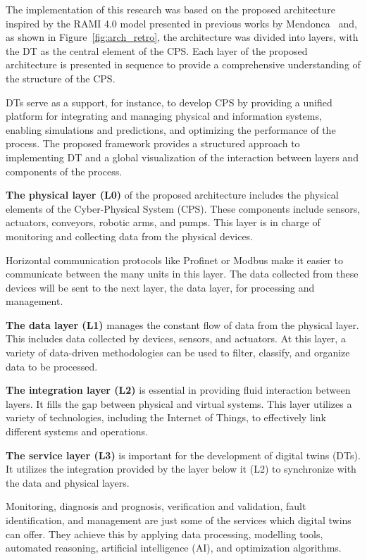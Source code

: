 \documentclass[journal]{IEEEtran}
\begin{document}
The implementation of this research was based on the proposed architecture inspired by the RAMI 4.0 model presented in previous works by Mendonca~\cite{Mendonca2022} and, as shown in Figure~\ref{fig:arch_retro}, the architecture was divided into layers, with the DT as the central element of the CPS. Each layer of the proposed architecture is presented in sequence to provide a comprehensive understanding of the structure of the CPS.

DTs serve as a support, for instance, to develop CPS by providing a unified platform for integrating and managing physical and information systems, enabling simulations and predictions, and optimizing the performance of the process\cite{Lopez2023b}. The proposed framework provides a structured approach to implementing DT and a global visualization of the interaction between layers and components of the process.

\textbf{The physical layer (L0)} of the proposed architecture includes the physical elements of the Cyber-Physical System (CPS). These components include sensors, actuators, conveyors, robotic arms, and pumps. This layer is in charge of monitoring and collecting data from the physical devices.

Horizontal communication protocols like Profinet or Modbus make it easier to communicate between the many units in this layer. The data collected from these devices will be sent to the next layer, the data layer, for processing and management.

\textbf{The data layer (L1)} manages the constant flow of data from the physical layer. This includes data collected by devices, sensors, and actuators. At this layer, a variety of data-driven methodologies can be used to filter, classify, and organize data to be processed.

\textbf{The integration layer (L2)} is essential in providing fluid interaction between layers. It fills the gap between physical and virtual systems. This layer utilizes a variety of technologies, including the Internet of Things, to effectively link different systems and operations.

\textbf{The service layer (L3)} is important for the development of digital twins (DTs). It utilizes the integration provided by the layer below it (L2) to synchronize with the data and physical layers.

Monitoring, diagnosis and prognosis, verification and validation, fault identification, and management are just some of the services which digital twins can offer. They achieve this by applying data processing, modelling tools, automated reasoning, artificial intelligence (AI), and optimization algorithms.
\end{document}
